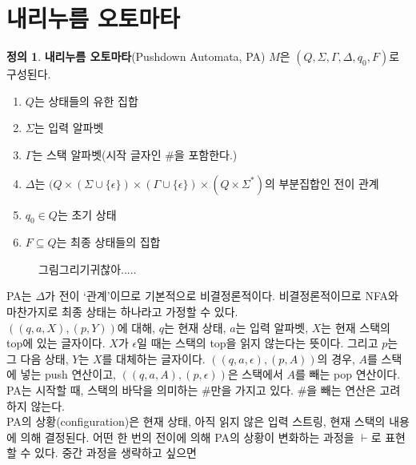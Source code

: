 \documentclass[b5paper, 10pt]{book}
\theoremstyle{definition}
\newtheorem{defn}{정의}[chapter]
\begin{document}
\section{내리누름 오토마타}
\begin{defn}
    \textbf{내리누름 오토마타}(Pushdown Automata, PA) $M$은 $(Q, \Sigma, 
    \Gamma, \Delta, q_0, F)$로 구성된다. 
    \begin{enumerate}
        \item $Q$는 상태들의 유한 집합
        \item $\Sigma$는 입력 알파벳
        \item $\Gamma$는 스택 알파벳(시작 글자인 \#을 포함한다.)
        \item $\Delta$는 $(Q \times (\Sigma \cup \{\epsilon\}) \times 
        (\Gamma \cup \{\epsilon\}) \times (Q \times \Sigma^*)$의 부분집합인 전이 관계
        \item $q_0 \in Q$는 초기 상태
        \item $F \subseteq Q$는 최종 상태들의 집합
    \end{enumerate}
\end{defn}
\begin{figure}[!ht]
    \centering
    \caption{그림그리기귀찮아.....}
\end{figure}
PA는 $\Delta$가 전이 `관계'이므로 기본적으로 비결정론적이다. 비결정론적이므로 NFA와 마찬가지로
최종 상태는 하나라고 가정할 수 있다. \\ 
$((q, a, X), (p, Y))$에 대해, $q$는 현재 상태, $a$는 입력 알파벳, $X$는 현재 스택의 
top에 있는 글자이다. $X$가 $\epsilon$일 때는 스택의 top을 읽지 않는다는 뜻이다. 
그리고 $p$는 그 다음 상태, $Y$는 $X$를 대체하는 글자이다. $((q,a,\epsilon),(p,A))$의 경우,
$A$를 스택에 넣는 push 연산이고, $((q,a,A),(p,\epsilon))$은 스택에서 $A$를 빼는 pop 연산이다. \\ 
PA는 시작할 때, 스택의 바닥을 의미하는 \#만을 가지고 있다. \#을 빼는 연산은 고려하지 않는다. \\ 
PA의 상황(configuration)은 현재 상태, 아직 읽지 않은 입력 스트링, 현재 스택의 내용에 의해 결정된다.
어떤 한 번의 전이에 의해 PA의 상황이 변화하는 과정을 $\vdash$로 표현할 수 있다. 중간 과정을 생략하고 싶으면
\end{document}
